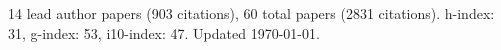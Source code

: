 14 lead author papers (903 citations),
60 total papers (2831 citations).\newline
h-index: 31, g-index: 53, i10-index: 47. Updated \today.